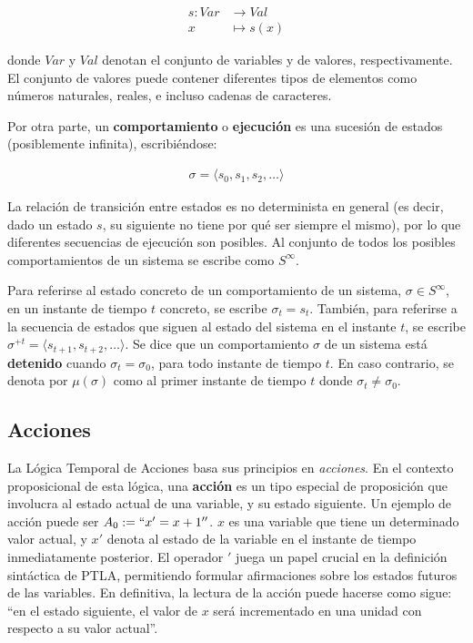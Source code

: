 \begin{align*}
    s : Var &\to Val \\
    x &\mapsto s(x)
\end{align*}

donde $Var$ y $Val$ denotan el conjunto de variables y de valores, respectivamente. El conjunto de valores puede contener diferentes tipos de elementos como números naturales, reales, e incluso cadenas de caracteres.

Por otra parte, un \textbf{comportamiento} o \textbf{ejecución} es una sucesión de estados (posiblemente infinita), escribiéndose:

\begin{align*}
    \sigma = \langle s_0, s_1, s_2, \ldots \rangle
\end{align*}

La relación de transición entre estados es no determinista en general (es decir, dado un estado $s$, su siguiente no tiene por qué ser siempre el mismo), por lo que diferentes secuencias de ejecución son posibles. Al conjunto de todos los posibles comportamientos de un sistema se escribe como $S^\infty$.

Para referirse al estado concreto de un comportamiento de un sistema, $\sigma \in S^\infty$, en un instante de tiempo $t$ concreto, se escribe $\sigma_t = s_t$. También, para referirse a la secuencia de estados que siguen al estado del sistema en el instante $t$, se escribe $\sigma^{+t} = \langle s_{t+1}, s_{t+2}, \ldots \rangle$. Se dice que un comportamiento $\sigma$ de un sistema está \textbf{detenido} cuando $\sigma_t = \sigma_0$, para todo instante de tiempo $t$. En caso contrario, se denota por $\mu(\sigma)$ como al primer instante de tiempo $t$ donde $\sigma_t \neq \sigma_0$.

\subsection{Acciones}\label{subsection:TLAactions}
La Lógica Temporal de Acciones basa sus principios en \textit{acciones}. En el contexto proposicional de esta lógica, una \textbf{acción} es un tipo especial de proposición que involucra al estado actual de una variable, y su estado siguiente. Un ejemplo de acción puede ser $A_0 := ``x' = x+1''$. $x$ es una variable que tiene un determinado valor actual, y $x'$ denota al estado de la variable en el instante de tiempo inmediatamente posterior. El operador $'$ juega un papel crucial en la definición sintáctica de PTLA, permitiendo formular afirmaciones sobre los estados futuros de las variables. En definitiva, la lectura de la acción puede hacerse como sigue: ``en el estado siguiente, el valor de $x$ será incrementado en una unidad con respecto a su valor actual''. 


